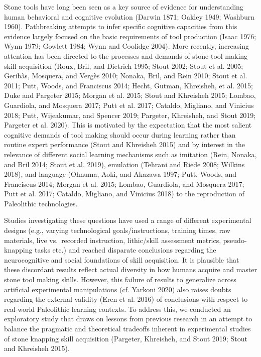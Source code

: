 \documentclass[smallextended]{svjour3}       %
\begin{document}
Stone tools have long been seen as a key source of evidence for
understanding human behavioral and cognitive evolution (Darwin 1871;
Oakley 1949; Washburn 1960). Pathbreaking attempts to infer specific
cognitive capacities from this evidence largely focused on the basic
requirements of tool production (Isaac 1976; Wynn 1979; Gowlett 1984;
Wynn and Coolidge 2004). More recently, increasing attention has been
directed to the processes and demands of stone tool making skill
acquisition (Roux, Bril, and Dietrich 1995; Stout 2002; Stout et al.
2005; Geribàs, Mosquera, and Vergès 2010; Nonaka, Bril, and Rein 2010;
Stout et al. 2011; Putt, Woods, and Franciscus 2014; Hecht, Gutman,
Khreisheh, et al. 2015; Duke and Pargeter 2015; Morgan et al. 2015;
Stout and Khreisheh 2015; Lombao, Guardiola, and Mosquera 2017; Putt et
al. 2017; Cataldo, Migliano, and Vinicius 2018; Putt, Wijeakumar, and
Spencer 2019; Pargeter, Khreisheh, and Stout 2019; Pargeter et al.
2020). This is motivated by the expectation that the most salient
cognitive demands of tool making should occur during learning rather
than routine expert performance (Stout and Khreisheh 2015) and by
interest in the relevance of different social learning mechanisms such
as imitation (Rein, Nonaka, and Bril 2014; Stout et al. 2019), emulation
(Tehrani and Riede 2008; Wilkins 2018), and language (Ohnuma, Aoki, and
Akazawa 1997; Putt, Woods, and Franciscus 2014; Morgan et al. 2015;
Lombao, Guardiola, and Mosquera 2017; Putt et al. 2017; Cataldo,
Migliano, and Vinicius 2018) to the reproduction of Paleolithic
technologies.

Studies investigating these questions have used a range of different
experimental designs (e.g., varying technological goals/instructions,
training times, raw materials, live vs.~recorded instruction,
lithic/skill assessment metrics, pseudo-knapping tasks etc.) and reached
disparate conclusions regarding the neurocognitive and social
foundations of skill acquisition. It is plausible that these discordant
results reflect actual diversity in how humans acquire and master stone
tool making skills. However, this failure of results to generalize
across artificial experimental manipulations
(\href{cf.\%20Yarkoni\%202020}{cf}. Yarkoni 2020) also raises doubts
regarding the external validity (Eren et al. 2016) of conclusions with
respect to real-world Paleolithic learning contexts. To address this, we
conducted an exploratory study that draws on lessons from previous
research in an attempt to balance the pragmatic and theoretical
tradeoffs inherent in experimental studies of stone knapping skill
acquisition (Pargeter, Khreisheh, and Stout 2019; Stout and Khreisheh
2015).
\end{document}
